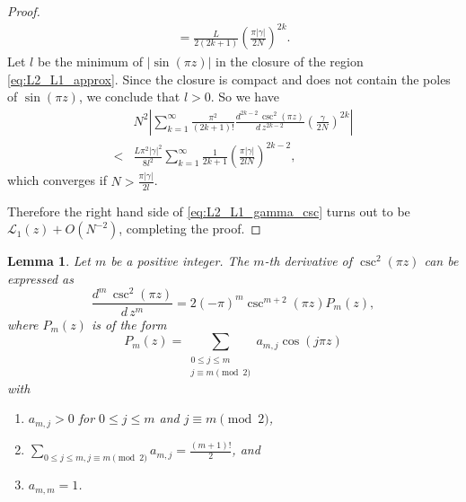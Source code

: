 \documentclass[a4paper,dvipdfmx]{amsart}
\theoremstyle{plain}
\newtheorem{lem}[thm]{Lemma}
\theoremstyle{definition}
\theoremstyle{remark}
\renewcommand{\L}{\mathcal{L}}
\numberwithin{equation}{section}
\begin{document}
\begin{proof}
\begin{align*}
  =
  \frac{L}{2(2k+1)}
  \left(\frac{\pi|\gamma|}{2N}\right)^{2k}.
\end{align*}
Let $l$ be the minimum of $|\sin(\pi z)|$ in the closure of the region \eqref{eq:L2_L1_approx}.
Since the closure is compact and does not contain the poles of $\sin(\pi z)$, we conclude that $l>0$.
So we have
\begin{align*}
  &N^2
  \left|
    \sum_{k=1}^{\infty}
    \frac{\pi^2}{(2k+1)!}\frac{d^{2k-2}\,\csc^2(\pi z)}{d\,z^{2k-2}}
    \left(\frac{\gamma}{2N}\right)^{2k}
  \right|
  \\
  <&
  \frac{L\pi^2|\gamma|^2}{8l^2}
  \sum_{k=1}^{\infty}
  \frac{1}{2k+1}\left(\frac{\pi|\gamma|}{2lN}\right)^{2k-2},
\end{align*}
which converges if $N>\frac{\pi|\gamma|}{2l}$.
\par
Therefore the right hand side of \eqref{eq:L2_L1_gamma_csc} turns out to be $\L_1(z)+O(N^{-2})$, completing the proof.
\end{proof}
\begin{lem}\label{lem:der_csc}
Let $m$ be a positive integer.
The $m$-th derivative of $\csc^2(\pi z)$ can be expressed as
\begin{equation*}
  \frac{d^{m}\,\csc^2(\pi z)}{d\,z^{m}}
  =
  2(-\pi)^{m}\csc^{m+2}(\pi z)P_m(z),
\end{equation*}
where $P_m(z)$ is of the form
\begin{equation*}
  P_m(z)=\sum_{\substack{0\le j\le m\\ j\equiv m\pmod{2}}}a_{m,j}\cos(j\pi z)
\end{equation*}
with
\begin{enumerate}
\item
$a_{m,j}>0$ for $0\le j\le m$ and $j\equiv m\pmod{2}$,
\item
$\sum_{0\le j\le m,j\equiv m\pmod{2}}a_{m,j}=\frac{(m+1)!}{2}$, and
\item
$a_{m,m}=1$.
\end{enumerate}
\end{lem}
\end{document}

